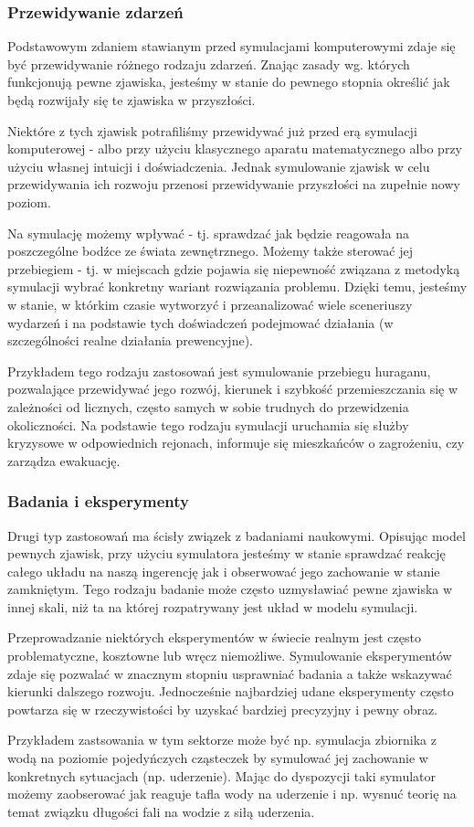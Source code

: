 \subsubsection{Przewidywanie zdarzeń}
\par{
Podstawowym zdaniem stawianym przed symulacjami komputerowymi zdaje się być przewidywanie różnego rodzaju zdarzeń. Znając zasady wg. których funkcjonują pewne zjawiska, jesteśmy w stanie do pewnego stopnia określić jak będą rozwijały się te zjawiska w przyszłości.
}
\par{
Niektóre z tych zjawisk potrafiliśmy przewidywać już przed erą symulacji komputerowej - albo przy użyciu klasycznego aparatu matematycznego albo przy użyciu własnej intuicji i doświadczenia. Jednak symulowanie zjawisk w celu przewidywania ich rozwoju przenosi przewidywanie przyszłości na zupełnie nowy poziom.
}
\par{
Na symulację możemy wpływać - tj. sprawdzać jak będzie reagowała na poszczególne bodźce ze świata zewnętrznego. Możemy także sterować jej przebiegiem - tj. w miejscach gdzie pojawia się niepewność związana z metodyką symulacji wybrać konkretny wariant rozwiązania problemu.
Dzięki temu, jesteśmy w stanie, w którkim czasie wytworzyć i przeanalizować wiele sceneriuszy wydarzeń i na podstawie tych doświadczeń podejmować działania (w szczególności realne działania prewencyjne).
}
\par{
Przykładem tego rodzaju zastosowań jest symulowanie przebiegu huraganu, pozwalające przewidywać jego rozwój, kierunek i szybkość przemieszczania się w zależności od licznych, często samych w sobie trudnych do przewidzenia okoliczności. Na podstawie tego rodzaju symulacji uruchamia się służby kryzysowe w odpowiednich rejonach, informuje się mieszkańców o zagrożeniu, czy zarządza ewakuację.
}

\subsubsection{Badania i eksperymenty}
\par{
Drugi typ zastosowań ma ścisły związek z badaniami naukowymi.
Opisując model pewnych zjawisk, przy użyciu symulatora jesteśmy w stanie sprawdzać reakcję całego układu na naszą ingerencję jak i obserwować jego zachowanie w stanie zamkniętym. Tego rodzaju badanie może często uzmysławiać pewne zjawiska w innej skali, niż ta na której rozpatrywany jest układ w modelu symulacji.
}
\par{
Przeprowadzanie niektórych eksperymentów w świecie realnym jest często problematyczne, kosztowne lub wręcz niemożliwe. Symulowanie eksperymentów zdaje się pozwalać w znacznym stopniu usprawniać badania a także wskazywać kierunki dalszego rozwoju. Jednocześnie najbardziej udane eksperymenty często powtarza się w rzeczywistości by uzyskać bardziej precyzyjny i pewny obraz.
}
\par{
Przykładem zastsowania w tym sektorze może być np. symulacja zbiornika z wodą na poziomie pojedyńczych cząsteczek by symulować jej zachowanie w konkretnych sytuacjach (np. uderzenie). Mając do dyspozycji taki symulator możemy zaobserować jak reaguje tafla wody na uderzenie i np. wysnuć teorię na temat związku długości fali na wodzie z siłą uderzenia.
}

